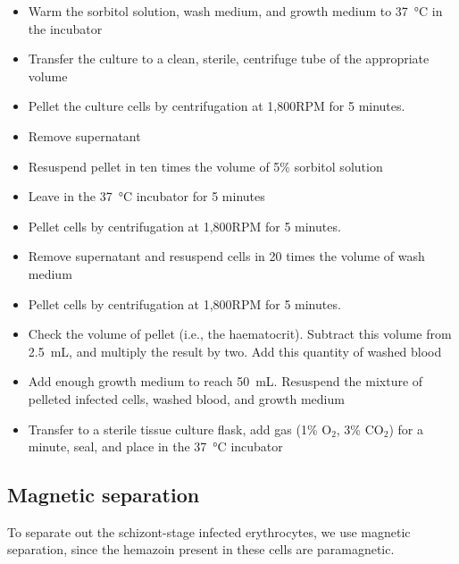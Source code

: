 \documentclass{article}
\begin{document}
\begin{itemize}
	\item Warm the sorbitol solution, wash medium, and growth medium to \SI{37}{\celsius} in the incubator
	\item Transfer the culture to a clean, sterile, centrifuge tube of the appropriate volume
	\item Pellet the culture cells by centrifugation at 1,800RPM for 5 minutes.
	\item Remove supernatant
	\item Resuspend pellet in ten times the volume of 5\% sorbitol solution
	\item Leave in the \SI{37}{\celsius} incubator for 5 minutes
	\item Pellet cells by centrifugation at 1,800RPM for 5 minutes.
	\item Remove supernatant and resuspend cells in 20 times the volume of wash medium
	\item Pellet cells by centrifugation at 1,800RPM for 5 minutes.
	\item Check the volume of pellet (i.e., the haematocrit). Subtract this volume from \SI{2.5}{mL}, and multiply the result by two. Add this quantity of washed blood
	\item Add enough growth medium to reach \SI{50}{mL}. Resuspend the mixture of pelleted infected cells, washed blood, and growth medium
	\item Transfer to a sterile tissue culture flask, add gas (1\% O$_2$, 3\% CO$_2$) for a minute, seal, and place in the \SI{37}{\celsius} incubator
\end{itemize}

\subsection{Magnetic separation}

To separate out the schizont-stage infected erythrocytes, we use magnetic separation, since the hemazoin present in these cells are paramagnetic.\\
\end{document}
